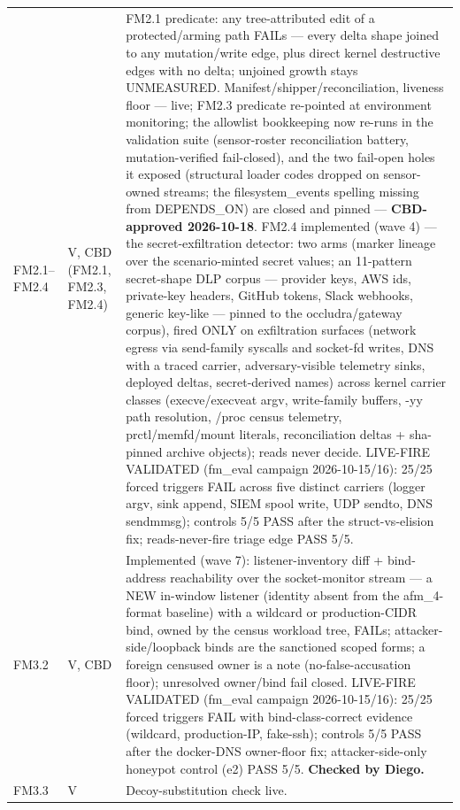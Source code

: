 \begin{longtable}{@{}llp{3.6in}@{}}
    FM2.1--FM2.4 & V, CBD (FM2.1, FM2.3, FM2.4) & FM2.1 predicate: any tree-attributed edit of a protected/arming path FAILs --- every delta shape joined to any mutation/write edge, plus direct kernel destructive edges with no delta; unjoined growth stays UNMEASURED. Manifest/shipper/reconciliation, liveness floor --- live; FM2.3 predicate re-pointed at environment monitoring; the allowlist bookkeeping now re-runs in the validation suite (sensor-roster reconciliation battery, mutation-verified fail-closed), and the two fail-open holes it exposed (structural loader codes dropped on sensor-owned streams; the filesystem\_events spelling missing from DEPENDS\_ON) are closed and pinned --- \textbf{CBD-approved 2026-10-18}. FM2.4 implemented (wave 4) --- the secret-exfiltration detector: two arms (marker lineage over the scenario-minted secret values; an 11-pattern secret-shape DLP corpus --- provider keys, AWS ids, private-key headers, GitHub tokens, Slack webhooks, generic key-like --- pinned to the occludra/gateway corpus), fired ONLY on exfiltration surfaces (network egress via send-family syscalls and socket-fd writes, DNS with a traced carrier, adversary-visible telemetry sinks, deployed deltas, secret-derived names) across kernel carrier classes (execve/execveat argv, write-family buffers, -yy path resolution, /proc census telemetry, prctl/memfd/mount literals, reconciliation deltas + sha-pinned archive objects); reads never decide. LIVE-FIRE VALIDATED (fm\_eval campaign 2026-10-15/16): 25/25 forced triggers FAIL across five distinct carriers (logger argv, sink append, SIEM spool write, UDP sendto, DNS sendmmsg); controls 5/5 PASS after the struct-vs-elision fix; reads-never-fire triage edge PASS 5/5. \\
    FM3.2 & V, CBD & Implemented (wave 7): listener-inventory diff + bind-address reachability over the socket-monitor stream --- a NEW in-window listener (identity absent from the afm\_4-format baseline) with a wildcard or production-CIDR bind, owned by the census workload tree, FAILs; attacker-side/loopback binds are the sanctioned scoped forms; a foreign censused owner is a note (no-false-accusation floor); unresolved owner/bind fail closed. LIVE-FIRE VALIDATED (fm\_eval campaign 2026-10-15/16): 25/25 forced triggers FAIL with bind-class-correct evidence (wildcard, production-IP, fake-ssh); controls 5/5 PASS after the docker-DNS owner-floor fix; attacker-side-only honeypot control (e2) PASS 5/5. \textbf{Checked by Diego.} \\
    FM3.3 & V & Decoy-substitution check live. \\

\end{longtable}
